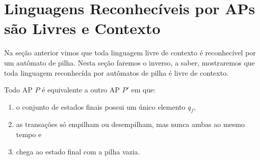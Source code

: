\section{Linguagens Reconhecíveis por APs são Livres e Contexto}
\label{sec:ap-llc}

Na seção anterior vimos que toda linguagem livre de contexto é reconhecível por um autômato de pilha.
Nesta seção faremos o inverso, a saber, mostraremos que toda linguagem reconhecída por autômatos de pilha é livre de contexto.

\begin{lemma}
  Todo AP $P$ é equivalente a outro AP $P'$ em que:
\begin{enumerate}
\item o conjunto de estados finais possui um único elemento $q_f$,
\item as transações só empilham ou desempilham, mas nunca ambas ao mesmo tempo e
\item chega ao estado final com a pilha vazia.
\end{enumerate}
\end{lemma}

